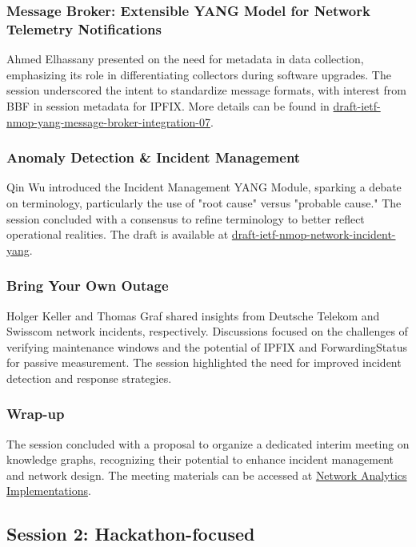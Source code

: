 \documentclass{article}
\begin{document}
\subsubsection{Message Broker: Extensible YANG Model for Network Telemetry Notifications}
Ahmed Elhassany presented on the need for metadata in data collection, emphasizing its role in differentiating collectors during software upgrades. The session underscored the intent to standardize message formats, with interest from BBF in session metadata for IPFIX. More details can be found in \href{https://datatracker.ietf.org/doc/html/draft-ietf-nmop-yang-message-broker-integration-07}{draft-ietf-nmop-yang-message-broker-integration-07}.

\subsubsection{Anomaly Detection \& Incident Management}
Qin Wu introduced the Incident Management YANG Module, sparking a debate on terminology, particularly the use of "root cause" versus "probable cause." The session concluded with a consensus to refine terminology to better reflect operational realities. The draft is available at \href{https://datatracker.ietf.org/doc/draft-ietf-nmop-network-incident-yang/}{draft-ietf-nmop-network-incident-yang}.

\subsubsection{Bring Your Own Outage}
Holger Keller and Thomas Graf shared insights from Deutsche Telekom and Swisscom network incidents, respectively. Discussions focused on the challenges of verifying maintenance windows and the potential of IPFIX and ForwardingStatus for passive measurement. The session highlighted the need for improved incident detection and response strategies.

\subsubsection{Wrap-up}
The session concluded with a proposal to organize a dedicated interim meeting on knowledge graphs, recognizing their potential to enhance incident management and network design. The meeting materials can be accessed at \href{https://www.network-analytics.org/yp/implementations.html}{Network Analytics Implementations}.

\subsection{Session 2: Hackathon-focused}
\end{document}
